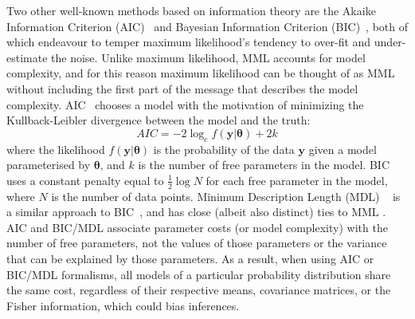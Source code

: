 \documentclass{elsarticle}
\newcommand{\vect}[1]{\boldsymbol{\mathbf{#1}}}
\renewcommand{\vec}[1]{\vect{#1}}
\def\datum{y}
\def\data{\vect{\datum}}
\begin{document}

Two other well-known methods based on information theory are the Akaike 
Information Criterion (AIC)~\cite{akaike1974} and Bayesian Information Criterion
(BIC)~\cite{schwarz1978estimating}, both of which endeavour to temper maximum 
likelihood's tendency to over-fit and under-estimate the noise. Unlike maximum
likelihood, MML accounts for model complexity, and for this reason maximum
likelihood can be thought of as MML without including the first part of the
message that describes the model complexity. AIC~\cite{akaike1974} chooses a 
model with the motivation of minimizing the Kullback-Leibler divergence 
between the model and the truth:
\begin{equation}
    AIC = -2 \log_{e}f(\vec{\data} | \vec{\theta}) + 2 k
\end{equation}
\noindent{}where the likelihood $f(\vec{\data} | \vec{\theta})$ is the probability 
of the data $\vec{\data}$ given a model parameterised by $\vec{\theta}$, and $k$ 
is the number of free parameters in the model. BIC~\cite{schwarz1978estimating} 
uses a constant penalty equal to $\frac{1}{2}\log{N}$ for each free parameter in the 
model, where $N$ is the number of data points. Minimum Description Length (MDL)
~\cite{rissanen1978modeling} is a similar approach to BIC~\cite{schwarz1978estimating},
and has close (albeit also distinct) ties to MML \cite{WallaceBoulton1968}.
AIC and BIC/MDL associate parameter costs (or model complexity) with the number 
of free parameters, not the values of those parameters or the variance that
can be explained by those parameters. As a result, when using AIC or BIC/MDL
formalisms, all models of a particular probability distribution share the same
cost, regardless of their respective means, covariance matrices, or the
Fisher information, which could bias inferences.


\end{document}
